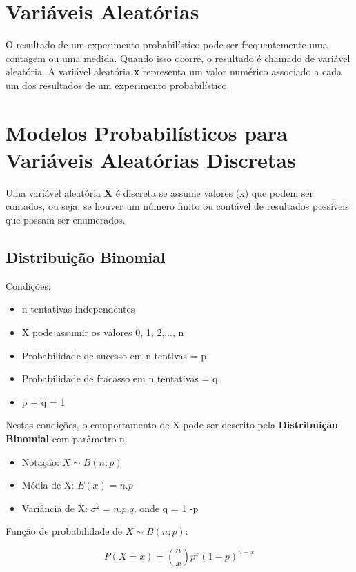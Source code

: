 \section{Variáveis Aleatórias}

O resultado de um experimento probabilístico pode ser frequentemente uma contagem ou uma medida. Quando isso ocorre, o resultado é chamado de variável aleatória. A variável aleatória \textbf{x} representa um valor numérico associado a cada um dos resultados de um experimento probabilístico.

\section{Modelos Probabilísticos para Variáveis Aleatórias Discretas}

Uma variável aleatória \textbf{X} é discreta se assume valores (x) que podem ser contados, ou seja, se houver um número finito ou contável de resultados possíveis que possam ser enumerados.

\subsection{Distribuição Binomial}

Condições:
\begin{itemize}
	\item n tentativas independentes
	\item X pode assumir os valores 0, 1, 2,..., n
	\item Probabilidade de sucesso em n tentivas = p
	\item Probabilidade de fracasso em n tentativas = q
	\item p + q = 1
\end{itemize}

Nestas condições, o comportamento de X pode ser descrito pela \textbf{Distribuição Binomial} com parâmetro n. 

\begin{itemize}
	\item Notação: \(X \sim B(n; p) \)
	\item Média de X: \( E(x) = n.p \)
	\item Variância de X: \( \sigma^2 = n.p.q \), onde q = 1 -p
\end{itemize}

Função de probabilidade de \(X \sim B(n; p) \):

\[P(X = x) = \binom{n}{x} p^x (1 - p)^{n-x} \]  

